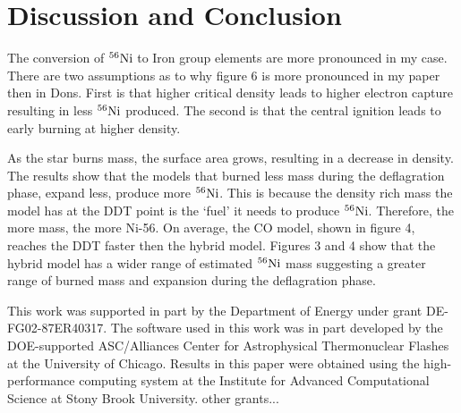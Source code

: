 \documentclass[iop,apj]{emulateapj}
\newcommand{\Ni}[1]{\ensuremath{{}^{#1}{\rm Ni}}}
\begin{document}
\section{Discussion and Conclusion}


The conversion of \Ni{56} to Iron group elements are more pronounced in my
case. There are two assumptions as to why figure 6 is more pronounced
in my paper then in Dons.  First is that higher critical density leads
to higher electron capture resulting in less \Ni{56} produced. The second
is that the central ignition leads to early burning at higher density.


As the star burns mass, the surface area grows, resulting in a decrease
in density. The results show that the models that burned less mass during
the deflagration phase, expand less, produce more \Ni{56}. This is because
the density rich mass the model has at the DDT point is the ‘fuel’
it needs to produce \Ni{56}. Therefore, the more mass, the more Ni-56. On
average, the CO model, shown in figure 4, reaches the DDT faster then
the hybrid model. Figures 3 and 4 show that the hybrid model has a wider
range of estimated \Ni{56} mass suggesting a greater range of burned mass
and expansion during the deflagration phase.

This work was supported in part by the Department of Energy under
grant DE-FG02-87ER40317. The software used in this work was in part
developed by the DOE-supported ASC/Alliances Center for Astrophysical
Thermonuclear Flashes at the University of Chicago. Results in this
paper were obtained using the high-performance computing system at the
Institute for Advanced Computational Science at Stony Brook
University.  other grants...



\end{document}
